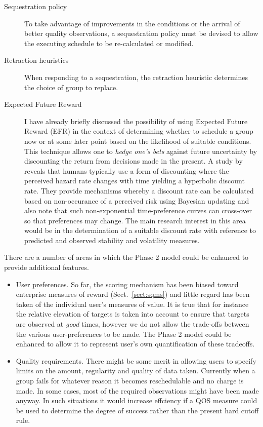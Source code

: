 \begin{description}
 \item [Sequestration policy]
To take advantage of improvements in the conditions or the arrival of better quality observations, a sequestration policy must be devised to allow the executing schedule to be re-calculated or modified.

 \item [Retraction heuristics]
When responding to a sequestration, the retraction heuristic determines the choice of group to replace.


 \item [Expected Future Reward]
I have already briefly discussed the possibility of using Expected Future Reward (EFR) in the context of determining whether to schedule a group now or at some later point based on the likelihood of suitable conditions. This technique allows one to \emph{hedge one's bets} against future uncertainty by discounting the return from decisions made in the present. A study by \cite{sozou98hyperbolic} reveals that humans typically use a form of discounting where the perceived hazard rate changes with time yielding a hyperbolic discount rate. They provide mechanisms whereby a discount rate can be calculated based on non-occurance of a perceived risk using Bayesian updating and also note that such non-exponential time-preference curves can cross-over so that preferences may change. The main research interest in this area would be in the determination of a suitable discount rate with reference to predicted and observed stability and volatility measures.

\end{description}


There are a number of areas in which the Phase 2 model could be enhanced to provide additional features.

\begin{itemize}

 \item User preferences. So far, the scoring mechanism has been biased toward enterprise measures of reward (Sect.~\ref{sect:sqms}) and little regard has been taken of the individual user's measures of value. It is true that for instance the relative elevation of targets is taken into account to ensure that targets are observed at \emph{good} times, however we do not allow the trade-offs between the various user-preferences to be made. The Phase 2 model could be enhanced to allow it to represent user's own quantification of these tradeoffs.


 \item Quality requirements. There might be some merit in allowing users to specify limits on the amount, regularity and quality of data taken. Currently when a group fails for whatever reason it becomes reschedulable and no charge is made. In some cases, most of the required observations might have been made anyway. In such situations it would increase effciency if a QOS measure could be used to determine the degree of success rather than the present hard cutoff rule.


\end{itemize}

